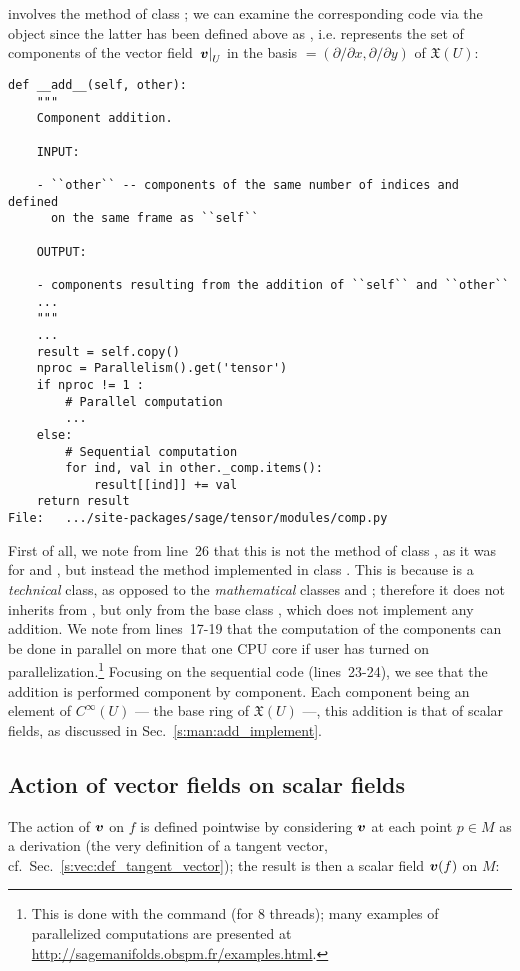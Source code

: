 involves the method  of class ; we
can examine the corresponding code via the object  since the
latter has been defined above as , i.e.
 represents the set of components of the vector field
$\left. \bm{v}\right| _U$ in the basis  $=(\partial/\partial x, \partial/\partial y)$
of $\mathfrak{X}(U)$:
\begin{lstlisting}
def __add__(self, other):
    """
    Component addition.

    INPUT:

    - ``other`` -- components of the same number of indices and defined
      on the same frame as ``self``

    OUTPUT:

    - components resulting from the addition of ``self`` and ``other``
    ...
    """
    ...
    result = self.copy()
    nproc = Parallelism().get('tensor')
    if nproc != 1 :
        # Parallel computation
        ...
    else:
        # Sequential computation
        for ind, val in other._comp.items():
            result[[ind]] += val
    return result
File:   .../site-packages/sage/tensor/modules/comp.py
\end{lstlisting}
First of all, we note from line~26
that this is not the method  of class ,
as it was for  and ,
but instead the method  implemented
in class . This is because  is a
\emph{technical} class, as opposed to the \emph{mathematical} classes
 and ; therefore it does not
inherits from , but only from the base class ,
which does not implement any addition.
We note from lines~17-19
that the computation of the components can be done in parallel on more that one CPU core if user has turned on parallelization.\footnote{This is done with the command
 (for 8 threads); many examples of
parallelized computations are presented at
\url{http://sagemanifolds.obspm.fr/examples.html}.}
Focusing on the sequential code (lines~23-24), we see that the addition is
performed component by component. Each component being an element of
$C^\infty(U)$ --- the base ring of $\mathfrak{X}(U)$ ---, this addition is that
of scalar fields, as discussed in Sec.~\ref{s:man:add_implement}.

\subsection{Action of vector fields on scalar fields} \label{s:vec:action_on_scalar}

The action of $\bm{v}$ on $f$ is defined pointwise by
considering $\bm{v}$ at each point $p\in M$ as a derivation (the very definition of a tangent vector,
cf.\ Sec.~\ref{s:vec:def_tangent_vector}); the result is then a scalar field $\bm{v}(f)$ on $M$:
